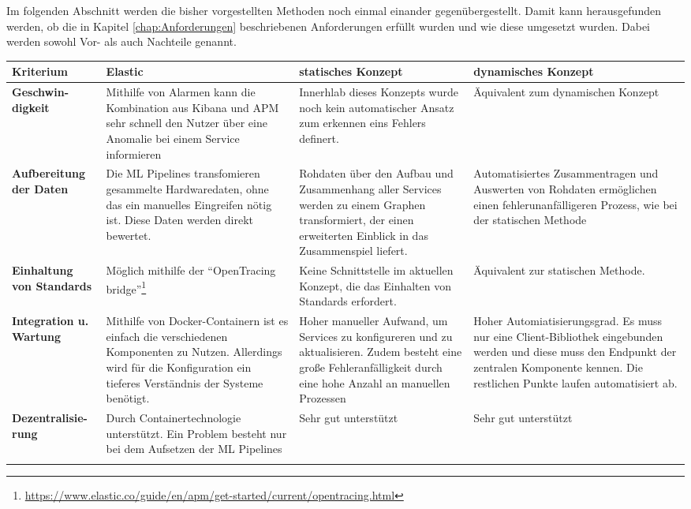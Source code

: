 Im folgenden Abschnitt werden die bisher vorgestellten Methoden noch einmal einander gegenübergestellt. Damit kann herausgefunden werden, ob die in Kapitel \vref{chap:Anforderungen} beschriebenen Anforderungen erfüllt wurden und wie diese umgesetzt wurden. Dabei werden sowohl Vor- als auch Nachteile genannt. 

\clearpage

\begin{tabularx}{\textwidth}{s|X|X|X}
	\textbf{Kriterium} & \textbf{Elastic} & \textbf{statisches Konzept} & \textbf{dynamisches Konzept}\\
	\hline
	\textbf{Geschwin-digkeit} & Mithilfe von Alarmen kann die Kombination aus Kibana und APM sehr schnell den Nutzer über eine Anomalie bei einem Service informieren & Innerhlab dieses Konzepts wurde noch kein automatischer Ansatz zum erkennen eins Fehlers definert. & Äquivalent zum dynamischen Konzept \\
	\hline
	\textbf{Aufbereitung der Daten} & Die \ac{ML} Pipelines transfomieren gesammelte Hardwaredaten, ohne das ein manuelles Eingreifen nötig ist. Diese Daten werden direkt bewertet. & Rohdaten über den Aufbau und Zusammenhang aller Services werden zu einem Graphen transformiert, der einen erweiterten Einblick in das Zusammenspiel liefert. & Automatisiertes Zusammentragen und Auswerten von Rohdaten ermöglichen einen fehlerunanfälligeren Prozess, wie bei der statischen Methode \\
	\hline
	\textbf{Einhaltung von Standards} & Möglich mithilfe der \enquote{OpenTracing bridge}\footnote{\url{https://www.elastic.co/guide/en/apm/get-started/current/opentracing.html}} & Keine Schnittstelle im aktuellen Konzept, die das Einhalten von Standards erfordert. & Äquivalent zur statischen Methode. \\
	\hline
	\textbf{Integration u. Wartung} & Mithilfe von Docker-Containern ist es einfach die verschiedenen Komponenten zu Nutzen. Allerdings wird für die Konfiguration ein tieferes Verständnis der Systeme benötigt. & Hoher manueller Aufwand, um Services zu konfigureren und zu aktualisieren. Zudem besteht eine große Fehleranfälligkeit durch eine hohe Anzahl an manuellen Prozessen & Hoher Automiatisierungsgrad. Es muss nur eine Client-Bibliothek eingebunden werden und diese muss den Endpunkt der zentralen Komponente kennen. Die restlichen Punkte laufen automatisiert ab. \\
	\hline
	\textbf{Dezentralisie-rung} & Durch Containertechnologie unterstützt. Ein Problem besteht nur bei dem Aufsetzen der \ac{ML} Pipelines & Sehr gut unterstützt & Sehr gut unterstützt \\
	\bottomrule
	\caption{Gegenüberstellung der verschiedenen Konzepte}
	\label{tab:Vergleich}
\end{tabularx}
